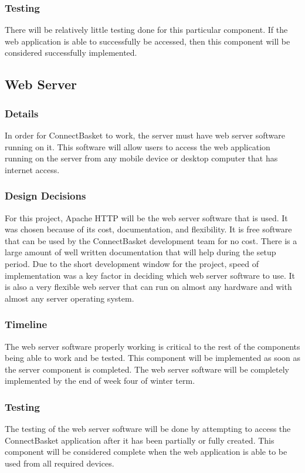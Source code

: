 \documentclass[onecolumn, draftclsnofoot,10pt, compsoc]{IEEEtran}
\begin{document}
\subsubsection{Testing}
There will be relatively little testing done for this particular component. If the web application is able to successfully be accessed, then this component will be considered successfully implemented.


\subsection{Web Server}

\subsubsection{Details}
In order for ConnectBasket to work, the server must have web server software running on it. This software will allow users to access the web application running on the server from any mobile device or desktop computer that has internet access.

\subsubsection{Design Decisions}
For this project, Apache HTTP will be the web server software that is used. It was chosen because of its cost, documentation, and flexibility. It is free software that can be used by the ConnectBasket development team for no cost. There is a large amount of well written documentation that will help during the setup period. Due to the short development window for the project, speed of implementation was a key factor in deciding which web server software to use. It is also a very flexible web server that can run on almost any hardware and with almost any server operating system\cite{apache}.


\subsubsection{Timeline}
The web server software properly working is critical to the rest of the components being able to work and be tested. This component will be implemented as soon as the server component is completed. The web server software will be completely implemented by the end of week four of winter term.

\subsubsection{Testing}
The testing of the web server software will be done by attempting to access the ConnectBasket application after it has been partially or fully created. This component will be considered complete when the web application is able to be used from all required devices.
\end{document}
